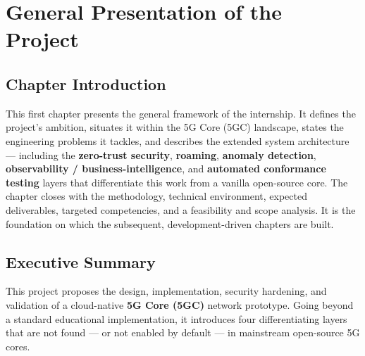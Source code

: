 \documentclass[11pt,a4paper]{report}
\begin{document}
\chapter{General Presentation of the Project}

\section*{Chapter Introduction}
This first chapter presents the general framework of the internship. It defines
the project's ambition, situates it within the 5G Core (5GC) landscape, states the
engineering problems it tackles, and describes the extended system architecture ---
including the \textbf{zero-trust security}, \textbf{roaming}, \textbf{anomaly
detection}, \textbf{observability / business-intelligence}, and \textbf{automated
conformance testing} layers that differentiate this work from a vanilla open-source
core. The chapter closes with the methodology, technical environment, expected
deliverables, targeted competencies, and a feasibility and scope analysis. It is the
foundation on which the subsequent, development-driven chapters are built.

\section{Executive Summary}
This project proposes the design, implementation, security hardening, and validation
of a cloud-native \textbf{5G Core (5GC)} network prototype. Going beyond a standard
educational implementation, it introduces four differentiating layers that are not
found --- or not enabled by default --- in mainstream open-source 5G cores.
\end{document}
